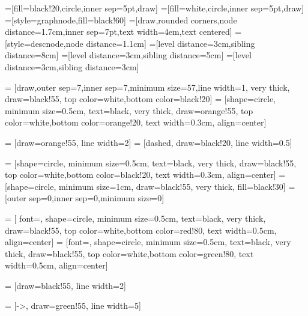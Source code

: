 \documentclass[10pt,a4paper,parskip]{scrbook}
\begin{document}
=[fill=black!20,circle,inner sep=5pt,draw]
=[fill=white,circle,inner sep=5pt,draw]
=[style=graphnode,fill=black!60]
=[draw,rounded corners,node distance=1.7cm,inner sep=7pt,text width=4em,text centered]
=[style=descnode,node distance=1.1cm]
=[level distance=3cm,sibling distance=8cm]
=[level distance=3cm,sibling distance=5cm]
=[level distance=3cm,sibling distance=3cm]
  

 = [draw,outer sep=7,inner sep=7,minimum size=57,line width=1, very thick, draw=black!55, top color=white,bottom color=black!20]
 = [shape=circle, minimum size=0.5cm,  text=black, very thick, draw=orange!55, top color=white,bottom color=orange!20, text width=0.3cm, align=center]


 = [draw=orange!55, line width=2]
 = [dashed, draw=black!20, line width=0.5]



 = [shape=circle, minimum size=0.5cm, text=black, very thick, draw=black!55, top color=white,bottom color=black!20, text width=0.3cm, align=center]
 = [shape=circle, minimum size=1cm, draw=black!55, very thick, fill=black!30]
 = [outer sep=0,inner sep=0,minimum size=0]

 = [  font={\huge\bfseries}, shape=circle, minimum size=0.5cm, text=black, very thick, draw=black!55, top color=white,bottom color=red!80, text width=0.5cm, align=center]
 = [font={\huge\bfseries}, shape=circle, minimum size=0.5cm, text=black, very thick, draw=black!55, top color=white,bottom color=green!80, text width=0.5cm, align=center]

 = [draw=black!55, line width=2]

 = [->, draw=green!55, line width=5]
\end{document}
